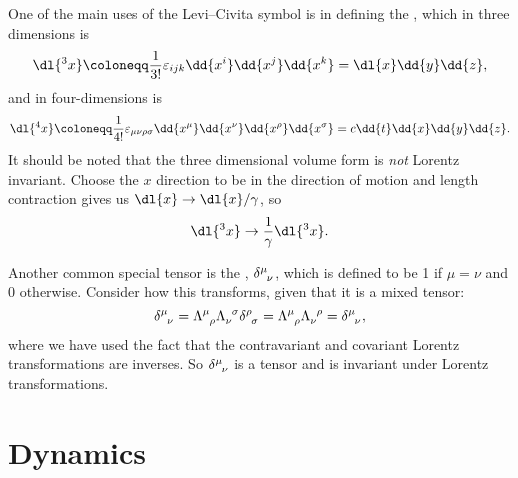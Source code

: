One of the main uses of the Levi--Civita symbol is in defining the , which in three dimensions is
\begin{equation}
    \dl{^3x} \coloneqq \frac{1}{3!}\varepsilon_{ijk}\dd{x^i}\dd{x^j}\dd{x^k} = \dl{x}\dd{y}\dd{z},
\end{equation}
and in four-dimensions is
\begin{align}
    \dl{^4x} \coloneqq \frac{1}{4!}\varepsilon_{\mu\nu\rho\sigma} \dd{x^\mu}\dd{x^\nu}\dd{x^\rho}\dd{x^\sigma} = c\dd{t}\dd{x}\dd{y}\dd{z}.
\end{align}
It should be noted that the three dimensional volume form is \emph{not} Lorentz invariant.
Choose the \(x\) direction to be in the direction of motion and length contraction gives us \(\dl{x} \to \dl{x}/\gamma\), so
\begin{equation}
    \dl{^3x} \to \frac{1}{\gamma}\dl{^3x}.
\end{equation}

Another common special tensor is the , \(\tensor{\delta}{^\mu_\nu}\), which is defined to be 1 if \(\mu = \nu\) and 0 otherwise.
Consider how this transforms, given that it is a mixed tensor:
\begin{equation}
    \tensor{\delta}{^\mu_\nu} = \tensor{\Lambda}{^\mu_\rho}\tensor{\Lambda}{_\nu^\sigma}\tensor{\delta}{^\rho_\sigma} = \tensor{\Lambda}{^\mu_\rho}\tensor{\Lambda}{_\nu^\rho} = \tensor{\delta}{^\mu_\nu},
\end{equation}
where we have used the fact that the contravariant and covariant Lorentz transformations are inverses.
So \(\tensor{\delta}{^\mu_\nu}\) is a tensor and is invariant under Lorentz transformations.

\chapter{Dynamics}
